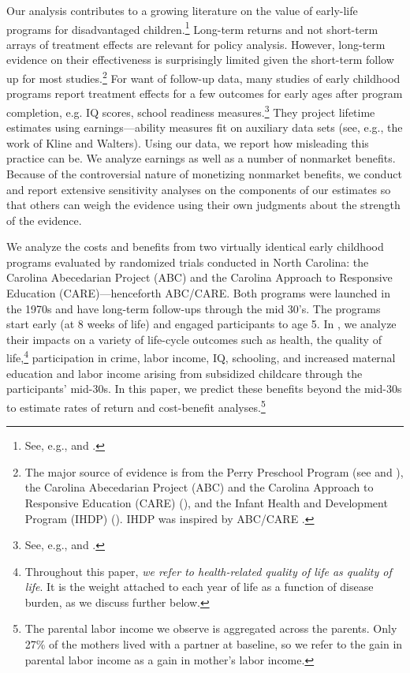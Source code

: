 Our analysis contributes to a growing literature on the value of early-life programs for disadvantaged children.\footnote{See, e.g., \cite{Currie_2011_AER} and \cite{Elango_Hojman_etal_2016_Early-Edu}.} Long-term returns and not short-term arrays of treatment effects are relevant for policy analysis. However, long-term evidence on their effectiveness is surprisingly limited given the short-term follow up for most studies.\footnote{The major source of evidence is from the Perry Preschool Program (see \citealp{Schweinhart_Montie_ea_2005_BOOKlifetime} and \citealp{Heckman_Moon_etal_2010_QE,Heckman_Moon_etal_2010_RateofReturn}), the Carolina Abecedarian Project (ABC) and the Carolina Approach to Responsive Education (CARE) (\citealp{Ramey_Campbell_etal_2000_ADS,Ramey-etal_2012-ABC}), and the Infant Health and Development Program (IHDP) (\citealp{Gross_Spiker_etal_1997_BOOKHelpinglowbirth,Duncan_Sojourner_2013_JHR}). IHDP was inspired by ABC/CARE \citep[][]{Gross_Spiker_etal_1997_BOOKHelpinglowbirth}.} For want of follow-up data, many studies of early childhood programs report treatment effects for a few outcomes for early ages after program completion, e.g. IQ scores, school readiness measures.\footnote{See, e.g., \cite{Kline_Walters_2016_QJE} and \cite{Weiland_2013_CD_Impacts-of-Pre-K}.} They project lifetime estimates using earnings---ability measures fit on auxiliary data sets (see, e.g., the work of Kline and Walters). Using our data, we report how misleading this practice can be. We analyze earnings as well as a number of nonmarket benefits. Because of the controversial nature of monetizing nonmarket benefits, we conduct and report extensive sensitivity analyses on the components of our estimates so that others can weigh the evidence using their own judgments about the strength of the evidence.

We analyze the costs and benefits from two virtually identical early childhood programs evaluated by randomized trials conducted in North Carolina: the Carolina Abecedarian Project (ABC) and the Carolina Approach to Responsive Education (CARE)---henceforth ABC/CARE. Both programs were launched in the 1970s and have long-term follow-ups through the mid 30's. The programs start early (at 8 weeks of life) and engaged participants to age 5. In \cite{Garcia_Ziff_2017_Gender-Diff_UNPUBLISHED}, we analyze their impacts on a variety of life-cycle outcomes such as health, the quality of life,\footnote{Throughout this paper, \textit{we refer to health-related quality of life as quality of life}. It is the weight attached to each year of life as a function of disease burden, as we discuss further below.} participation in crime, labor income, IQ, schooling, and increased maternal education and labor income arising from subsidized childcare through the participants' mid-30s. In this paper, we predict these benefits beyond the mid-30s to estimate rates of return and cost-benefit analyses.\footnote{The parental labor income we observe is aggregated across the parents. Only 27\% of the mothers lived with a partner at baseline, so we refer to the gain in parental labor income as a gain in mother's labor income.}

